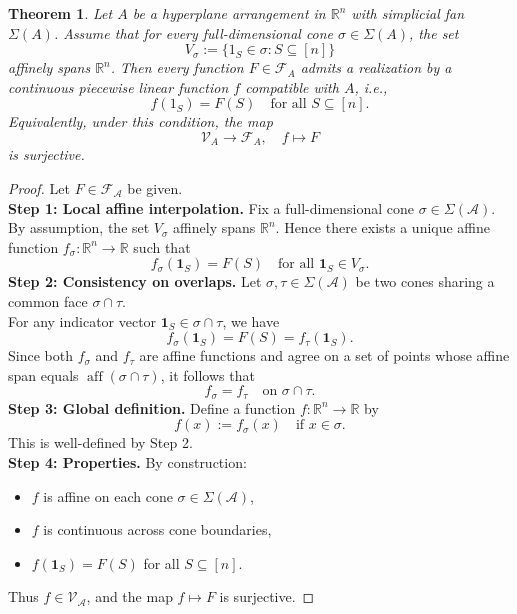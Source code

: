 \documentclass{amsart}
\newtheorem{theorem}{Theorem}[section]
\theoremstyle{definition}
\begin{document}
\begin{theorem}\label{thm:indicator}
Let $A$ be a hyperplane arrangement in $\mathbb{R}^n$ with simplicial fan $\Sigma(A)$. Assume that for every full-dimensional cone $\sigma \in \Sigma(A)$, the set
\[
V_\sigma := \{1_S \in \sigma : S \subseteq [n]\}
\]
affinely spans $\mathbb{R}^n$. Then every function $F \in \mathcal{F}_A$ admits a realization by a continuous piecewise linear function $f$ compatible with $A$, i.e.,
\[
f(1_S) = F(S) \quad \text{for all } S \subseteq [n].
\]
Equivalently, under this condition, the map
\[
\mathcal{V}_A \to \mathcal{F}_A, \quad f \mapsto F
\]
is surjective.
\end{theorem}
\begin{proof}
Let $F \in \mathcal{F}_{\mathcal{A}}$ be given.\\
\noindent
\textbf{Step 1: Local affine interpolation.}
Fix a full-dimensional cone $\sigma \in \Sigma(\mathcal{A})$. By assumption, the set $V_\sigma$ affinely spans $\mathbb{R}^n$. Hence there exists a unique affine function $f_\sigma : \mathbb{R}^n \to \mathbb{R}$ such that
\[
f_\sigma(\mathbf{1}_S) = F(S) \quad \text{for all } \mathbf{1}_S \in V_\sigma.
\]
\noindent
\textbf{Step 2: Consistency on overlaps.}
Let $\sigma, \tau \in \Sigma(\mathcal{A})$ be two cones sharing a common face $\sigma \cap \tau$. \\
\noindent
For any indicator vector $\mathbf{1}_S \in \sigma \cap \tau$, we have
\[
f_\sigma(\mathbf{1}_S) = F(S) = f_\tau(\mathbf{1}_S).
\]
\noindent
Since both $f_\sigma$ and $f_\tau$ are affine functions and agree on a set of points whose affine span equals $\operatorname{aff}(\sigma \cap \tau)$, it follows that
\[
f_\sigma = f_\tau \quad \text{on } \sigma \cap \tau.
\]
\noindent
\textbf{Step 3: Global definition.}
Define a function $f : \mathbb{R}^n \to \mathbb{R}$ by
\[
f(x) := f_\sigma(x) \quad \text{if } x \in \sigma.
\]
\noindent
This is well-defined by Step 2.\\
\noindent
\textbf{Step 4: Properties.}
By construction:
\begin{itemize}
\item $f$ is affine on each cone $\sigma \in \Sigma(\mathcal{A})$,
\item $f$ is continuous across cone boundaries,
\item $f(\mathbf{1}_S) = F(S)$ for all $S \subseteq [n]$.
\end{itemize}

Thus $f \in \mathcal{V}_{\mathcal{A}}$, and the map $f \mapsto F$ is surjective.
\end{proof}
\end{document}
